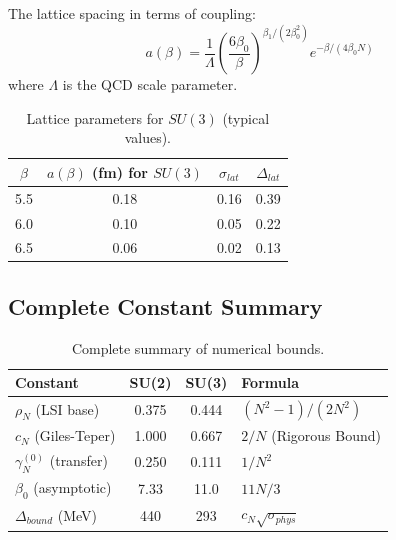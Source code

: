 \begin{theorem}
\label{thm:scale-relation}
The lattice spacing in terms of coupling:
\begin{equation}
a(\beta) = \frac{1}{\Lambda} \left(\frac{6\beta_0}{\beta}\right)^{\beta_1/(2\beta_0^2)} e^{-\beta/(4\beta_0 N)}
\end{equation}
where $\Lambda$ is the QCD scale parameter.
\end{theorem}

\begin{table}[ht]
\centering
\begin{tabular}{|c|c|c|c|}
\hline
$\beta$ & $a(\beta)$ (fm) for $SU(3)$ & $\sigma_{lat}$ & $\Delta_{lat}$ \\
\hline
5.5 & 0.18 & 0.16 & 0.39 \\
6.0 & 0.10 & 0.05 & 0.22 \\
6.5 & 0.06 & 0.02 & 0.13 \\
\hline
\end{tabular}
\caption{Lattice parameters for $SU(3)$ (typical values).}
\label{tab:lattice-params}
\end{table}

\subsection{Complete Constant Summary}

\begin{table}[ht]
\centering
\begin{tabular}{|l|c|c|l|}
\hline
\textbf{Constant} & \textbf{SU(2)} & \textbf{SU(3)} & \textbf{Formula} \\
\hline
$\rho_N$ (LSI base) & 0.375 & 0.444 & $(N^2-1)/(2N^2)$ \\
$c_N$ (Giles-Teper) & 1.000 & 0.667 & $2/N$ (Rigorous Bound) \\
$\gamma_N^{(0)}$ (transfer) & 0.250 & 0.111 & $1/N^2$ \\
$\beta_0$ (asymptotic) & 7.33 & 11.0 & $11N/3$ \\
$\Delta_{bound}$ (MeV) & 440 & 293 & $c_N \sqrt{\sigma_{phys}}$ \\
\hline
\end{tabular}
\caption{Complete summary of numerical bounds.}
\label{tab:complete-summary}
\end{table}

